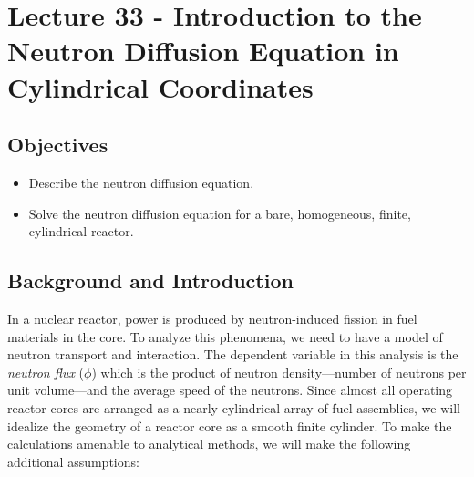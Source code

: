 \chapter{Lecture 33 - Introduction to the Neutron Diffusion Equation in Cylindrical Coordinates}
\label{ch:lec33}
\section{Objectives}
\begin{itemize}
\item Describe the neutron diffusion equation.
\item Solve the neutron diffusion equation for a bare, homogeneous, finite, cylindrical reactor. 
\end{itemize}
\setcounter{lstannotation}{0}

\section{Background and Introduction}
In a nuclear reactor, power is produced by neutron-induced fission in fuel materials in the core.  To analyze this phenomena, we need to have a model of neutron transport and interaction.  The dependent variable in this analysis is the \emph{neutron flux} ($\phi$) which is the product of neutron density---number of neutrons per unit volume---and the average speed of the neutrons.  Since almost all operating reactor cores are arranged as a nearly cylindrical array of fuel assemblies, we will idealize the geometry of a reactor core as a smooth finite cylinder.  To make the calculations amenable to analytical methods, we will make the following additional assumptions:
